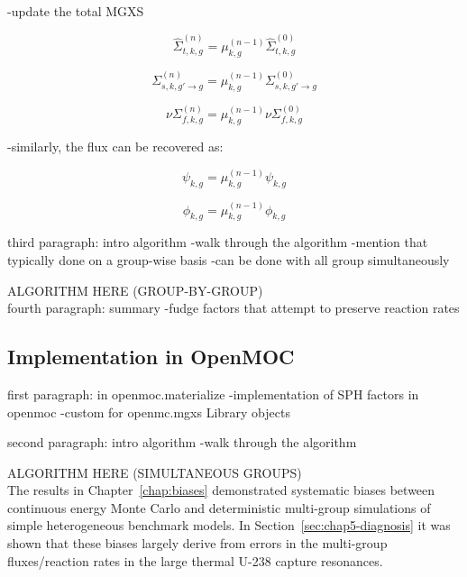 -update the total MGXS

\begin{dmath}
\label{eqn:chap5-sph-update-sigt}
\hat{\Sigma}_{t,k,g}^{(n)} = \mu_{k,g}^{(n-1)}\hat{\Sigma}_{t,k,g}^{(0)}
\end{dmath}

\begin{dmath}
\label{eqn:chap5-sph-update-sigs}
\Sigma_{s,k,g'\rightarrow g}^{(n)} = \mu_{k,g}^{(n-1)}\Sigma_{s,k,g'\rightarrow g}^{(0)}
\end{dmath}

\begin{dmath}
\label{eqn:chap5-sph-update-nusigf}
\nu\Sigma_{f,k,g}^{(n)} = \mu_{k,g}^{(n-1)}\nu\Sigma_{f,k,g}^{(0)}
\end{dmath}

-similarly, the flux can be recovered as:

\begin{dmath}
\label{eqn:chap5-sph-update-angular-flux}
\psi_{k,g} = \mu_{k,g}^{(n-1)}\psi_{k,g}
\end{dmath}

\begin{dmath}
\label{eqn:chap5-sph-update-scalar-flux}
\phi_{k,g} = \mu_{k,g}^{(n-1)}\phi_{k,g}
\end{dmath}

third paragraph: intro algorithm
-walk through the algorithm
-mention that typically done on a group-wise basis
-can be done with all group simultaneously

ALGORITHM HERE (GROUP-BY-GROUP)\\

fourth paragraph: summary
-fudge factors that attempt to preserve reaction rates


\subsection{Implementation in OpenMOC}
\label{subsec:chap5-sph-openmoc}

first paragraph: in openmoc.materialize
-implementation of SPH factors in openmoc
-custom for openmc.mgxs Library objects

second paragraph: intro algorithm
-walk through the algorithm

ALGORITHM HERE (SIMULTANEOUS GROUPS)\\


The results in Chapter~\ref{chap:biases} demonstrated systematic biases between continuous energy Monte Carlo and deterministic multi-group simulations of simple heterogeneous benchmark models. In Section~\ref{sec:chap5-diagnosis} it was shown that these biases largely derive from errors in the multi-group fluxes/reaction rates in the large thermal U-238 capture resonances. 


